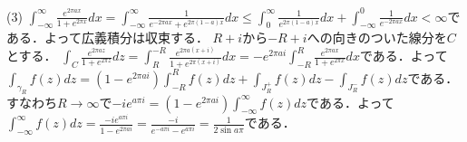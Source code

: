 \documentclass[
		book,
		head_space=20mm,
		foot_space=20mm,
		gutter=10mm,
		line_length=190mm
]{jlreq}
\begin{document}
(3)
$\int_{-\infty}^\infty\frac{e^{2\pi ax}}{1+e^{2\pi x}}dx=\int_{-\infty}^\infty \frac{1}{e^{-2\pi ax}+e^{2\pi(1-a) x}}dx\le \int_0^\infty \frac{1}{e^{2\pi(1-a)x}}dx+\int_{-\infty}^0 \frac{1}{e^{-2\pi ax}}dx<\infty$である．よって広義積分は収束する．
$R+i$から$-R+i$への向きのついた線分を$C$とする．
$\int_C\frac{e^{2\pi a z}}{1+e^{2\pi z}}dz=\int_R^{-R}\frac{e^{2\pi a (x+i)}}{1+e^{2\pi (x+i)}}dx=-e^{2\pi a i}\int_{-R}^R \frac{e^{2\pi a x}}{1+e^{2\pi x}}dx$である．よって
$\int_{\gamma_R}f(z)dz=(1-e^{2\pi a i})\int_{-R}^Rf(z)dz+\int_{J^+_R}f(z)dz-\int_{J^-_R}f(z)dz$である．すなわち$R\rightarrow \infty$で$-i e^{a \pi i}=(1-e^{2\pi a i})\int_{-\infty}^\infty f(z)dz$である．よって$\int_{-\infty}^\infty f(z)dz=\frac{-i e^{a \pi i}}{1-e^{2\pi a i}}=\frac{-i}{e^{-a\pi i}-e^{a \pi i}}=\frac{1}{2\sin a\pi}$である．
\end{document}
